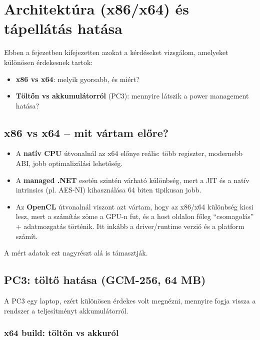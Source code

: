 \chapter{Architektúra (x86/x64) és tápellátás hatása}

Ebben a fejezetben kifejezetten azokat a kérdéseket vizsgálom, amelyeket különösen érdekesnek tartok:

\begin{itemize}
  \item \textbf{x86 vs x64}: melyik gyorsabb, és miért?
  \item \textbf{Töltőn vs akkumulátorról} (PC3): mennyire látszik a power management hatása?
\end{itemize}

\section{x86 vs x64 -- mit vártam előre?}

\begin{itemize}
  \item A \textbf{natív CPU} útvonalnál az x64 előnye reális: több regiszter, modernebb ABI, jobb optimalizálási lehetőség.
  \item A \textbf{managed .NET} esetén szintén várható különbség, mert a JIT és a natív intrinsics (pl. AES-NI) kihasználása 64 biten tipikusan jobb.
  \item Az \textbf{OpenCL} útvonalnál viszont azt vártam, hogy az x86/x64 különbség kicsi lesz, mert a számítás zöme a GPU-n fut,
        és a host oldalon főleg ``csomagolás'' + adatmozgatás történik. Itt inkább a driver/runtime verzió és a platform számít.
\end{itemize}

A mért adatok ezt nagyrészt alá is támasztják.

\section{PC3: töltő hatása (GCM-256, 64 MB)}

A PC3 egy laptop, ezért különösen érdekes volt megnézni, mennyire fogja vissza a rendszer a teljesítményt akkumulátorról.

\subsection{x64 build: töltőn vs akkuról}


